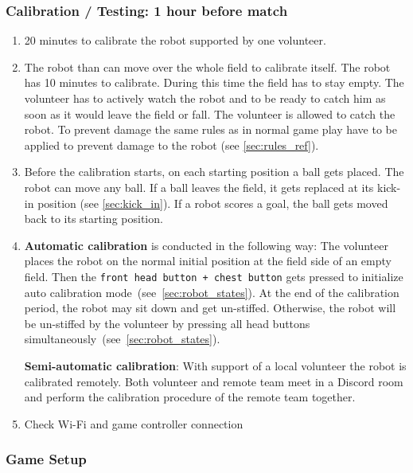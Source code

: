 \subsubsection{Calibration / Testing: 1 hour before match}
    \begin{enumerate}
        \item 20 minutes to calibrate the robot supported by one volunteer.
        \item The robot than can move over the whole field to calibrate itself. The robot has 10 minutes to calibrate. During this time the field has to stay empty. The volunteer has to actively watch the robot and to be ready to catch him as soon as it would leave the field or fall. The volunteer is allowed to catch the robot. To prevent damage the same rules as in normal game play have to be applied to prevent damage to the robot (see \ref{sec:rules_ref}).
        \item Before the calibration starts, on each starting position a ball gets placed. The robot can move any ball. If a ball leaves the field, it gets replaced at its kick-in position (see \ref{sec:kick_in}). If a robot scores a goal, the ball gets moved back to its starting position. 
        \item \textbf{Automatic calibration} is conducted in the following way: The volunteer places the robot on the normal initial position at the field side of an empty field. Then the \texttt{front head button + chest button} gets pressed to initialize auto calibration mode~(see~\ref{sec:robot_states}).  At the end of the calibration period, the robot may sit down and get un-stiffed. Otherwise, the robot will be un-stiffed by the volunteer by pressing all head buttons simultaneously~(see~\ref{sec:robot_states}).
        
        \textbf{Semi-automatic calibration}: With support of a local volunteer the robot is calibrated remotely. Both volunteer and remote team meet in a Discord room and perform the calibration procedure of the remote team together.

        \item  Check Wi-Fi and game controller connection
    \end{enumerate}

\subsubsection{Game Setup}

